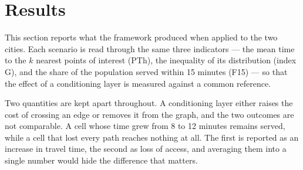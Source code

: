 \section{Results}
\label{sec:results}

This section reports what the framework produced when applied to the two cities. Each scenario is read through the same three indicators — the mean time to the $k$ nearest points of interest (PTh), the inequality of its distribution (index G), and the share of the population served within 15 minutes (F15) — so that the effect of a conditioning layer is measured against a common reference.

Two quantities are kept apart throughout. A conditioning layer either raises the cost of crossing an edge or removes it from the graph, and the two outcomes are not comparable. A cell whose time grew from 8 to 12 minutes remains served, while a cell that lost every path reaches nothing at all. The first is reported as an increase in travel time, the second as loss of access, and averaging them into a single number would hide the difference that matters.







